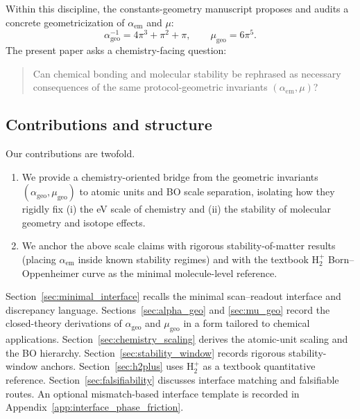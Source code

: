 Within this discipline, the constants-geometry manuscript \cite{Ma2025PCG} proposes and audits a concrete geometricization of $\alpha_{\mathrm{em}}$ and $\mu$:
\begin{equation}
\alpha_{\mathrm{geo}}^{-1}=4\pi^3+\pi^2+\pi,\qquad
\mu_{\mathrm{geo}}=6\pi^5.
\end{equation}
The present paper asks a chemistry-facing question:
\begin{quote}
Can chemical bonding and molecular stability be rephrased as necessary consequences of the same protocol-geometric invariants $(\alpha_{\mathrm{em}},\mu)$?
\end{quote}

\subsection{Contributions and structure}
Our contributions are twofold.
\begin{enumerate}
\item We provide a chemistry-oriented bridge from the geometric invariants $(\alpha_{\mathrm{geo}},\mu_{\mathrm{geo}})$ to atomic units and BO scale separation, isolating how they rigidly fix (i) the eV scale of chemistry and (ii) the stability of molecular geometry and isotope effects.
\item We anchor the above scale claims with rigorous stability-of-matter results (placing $\alpha_{\mathrm{em}}$ inside known stability regimes) and with the textbook $\mathrm{H}_2^+$ Born--Oppenheimer curve as the minimal molecule-level reference.
\end{enumerate}

Section~\ref{sec:minimal_interface} recalls the minimal scan--readout interface and discrepancy language. Sections~\ref{sec:alpha_geo} and \ref{sec:mu_geo} record the closed-theory derivations of $\alpha_{\mathrm{geo}}$ and $\mu_{\mathrm{geo}}$ in a form tailored to chemical applications. Section~\ref{sec:chemistry_scaling} derives the atomic-unit scaling and the BO hierarchy. Section~\ref{sec:stability_window} records rigorous stability-window anchors. Section~\ref{sec:h2plus} uses $\mathrm{H}_2^+$ as a textbook quantitative reference. Section~\ref{sec:falsifiability} discusses interface matching and falsifiable routes. An optional mismatch-based interface template is recorded in Appendix~\ref{app:interface_phase_friction}.



